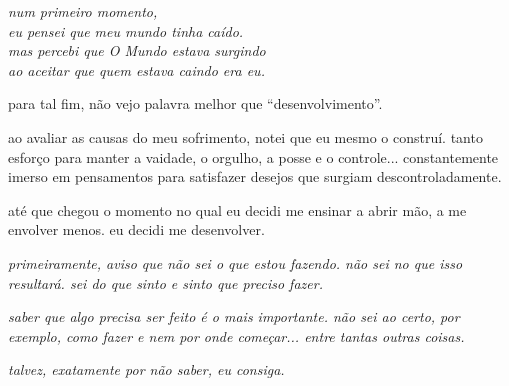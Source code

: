 \begin{flushright}
\emph{num primeiro momento,\\eu pensei que meu mundo tinha caído.\\mas percebi que O Mundo estava surgindo\\ao aceitar que quem estava caindo era eu.}
\end{flushright}

para tal fim, não vejo palavra melhor que ``desenvolvimento''.

ao avaliar as causas do meu sofrimento, notei que eu mesmo o construí. tanto esforço para manter a vaidade, o orgulho, a posse e o controle... constantemente imerso em pensamentos para satisfazer desejos que surgiam descontroladamente.

até que chegou o momento no qual eu decidi me ensinar a abrir mão, a me envolver menos. eu decidi me desenvolver.

\begin{flushright}
\emph{primeiramente, aviso que não sei o que estou fazendo. não sei no que isso resultará. sei do que sinto e sinto que preciso fazer.}

\emph{saber que algo precisa ser feito é o mais importante. não sei ao certo, por exemplo, como fazer e nem por onde começar... entre tantas outras coisas.}

\emph{talvez, exatamente por não saber, eu consiga.}
\end{flushright}
